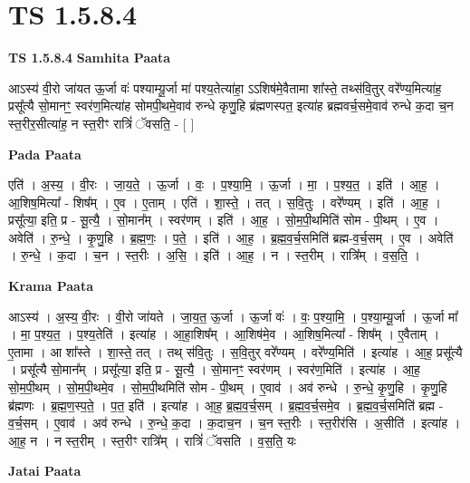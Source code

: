 \documentclass[17pt]{extarticle}
\begin{document}
\section{ TS 1.5.8.4 }

\textbf{TS 1.5.8.4 } \newline
\textbf{Samhita Paata} \newline

आऽस्य॑ वी॒रो जा॑यत ऊ॒र्जा वः॑ पश्याम्यू॒र्जा मा॑ पश्य॒तेत्या॑हा॒ ऽऽशिष॑मे॒वैतामा शा᳚स्ते॒ तथ्स॑वि॒तुर् वरे᳚ण्य॒मित्या॑ह॒ प्रसू᳚त्यै सो॒मानꣳ॒॒ स्वर॑ण॒मित्या॑ह सोमपी॒थमे॒वाव॑ रुन्धे कृणु॒हि ब्र॑ह्मणस्पत॒ इत्या॑ह ब्रह्मवर्च॒समे॒वाव॑ रुन्धे क॒दा च॒न स्त॒रीर॒सीत्या॑ह॒ न स्त॒रीꣳ रात्रिं॑ ॅवसति॒ - [ ] \newline

\textbf{Pada Paata} \newline

एति॑ । अ॒स्य॒ । वी॒रः । जा॒य॒ते॒ । ऊ॒र्जा । वः॒ । प॒श्या॒मि॒ । ऊ॒र्जा । मा॒ । प॒श्य॒त॒ । इति॑ । आ॒ह॒ । आ॒शिष॒मित्या᳚ - शिष᳚म् । ए॒व । ए॒ताम् । एति॑ । शा॒स्ते॒ । तत् । स॒वि॒तुः । वरे᳚ण्यम् । इति॑ । आ॒ह॒ । प्रसू᳚त्या॒ इति॒ प्र - सू॒त्यै॒ । सो॒मान᳚म् । स्वर॑णम् । इति॑ । आ॒ह॒ । सो॒म॒पी॒थमिति॑ सोम - पी॒थम् । ए॒व । अवेति॑ । रु॒न्धे॒ । कृ॒णु॒हि । ब्र॒ह्म॒णः॒ । प॒ते॒ । इति॑ । आ॒ह॒ । ब्र॒ह्म॒व॒र्च॒समिति॑ ब्रह्म-व॒र्च॒सम् । ए॒व । अवेति॑ । रु॒न्धे॒ । क॒दा । च॒न । स्त॒रीः । अ॒सि॒ । इति॑ । आ॒ह॒ । न । स्त॒रीम् । रात्रि᳚म् । व॒स॒ति॒ ।  \newline


\textbf{Krama Paata} \newline

आऽस्य॑ । अ॒स्य॒ वी॒रः । वी॒रो जा॑यते । जा॒य॒त॒ ऊ॒र्जा । ऊ॒र्जा वः॑ । वः॒ प॒श्या॒मि॒ । प॒श्या॒म्यू॒र्जा । ऊ॒र्जा मा᳚ । मा॒ प॒श्य॒त॒ । प॒श्य॒तेति॑ । इत्या॑ह । आ॒हा॒शिष᳚म् । आ॒शिष॑मे॒व । आ॒शिष॒मित्या᳚ - शिष᳚म् । ए॒वैताम् । ए॒तामा । आ शा᳚स्ते । शा॒स्ते॒ तत् । तथ् स॑वि॒तुः । स॒वि॒तुर् वरे᳚ण्यम् । वरे᳚ण्य॒मिति॑ । इत्या॑ह । आ॒ह॒ प्रसू᳚त्यै । प्रसू᳚त्यै सो॒मान᳚म् । प्रसू᳚त्या॒ इति॒ प्र - सू॒त्यै॒ । सो॒मानꣳ॒॒ स्वर॑णम् । स्वर॑ण॒मिति॑ । इत्या॑ह । आ॒ह॒ सो॒म॒पी॒थम् । सो॒म॒पी॒थमे॒व । सो॒म॒पी॒थमिति॑ सोम - पी॒थम् । ए॒वाव॑ । अव॑ रुन्धे । रु॒न्धे॒ कृ॒णु॒हि । कृ॒णु॒हि ब्र॑ह्मणः । ब्र॒ह्म॒ण॒स्प॒ते॒ । प॒त॒ इति॑ । इत्या॑ह । आ॒ह॒ ब्र॒ह्म॒व॒र्च॒सम् । ब्र॒ह्म॒व॒र्च॒समे॒व । ब्र॒ह्म॒व॒र्च॒समिति॑ ब्रह्म - व॒र्च॒सम् । ए॒वाव॑ । अव॑ रुन्धे । रु॒न्धे॒ क॒दा । क॒दाच॒न । च॒न स्त॒रीः । स्त॒रीर॑सि । अ॒सीति॑ । इत्या॑ह । आ॒ह॒ न । न स्त॒रीम् । स्त॒रीꣳ रात्रि᳚म् । रात्रिं॑ ॅवसति । व॒स॒ति॒ यः \newline

\textbf{Jatai Paata} \newline
\end{document}
